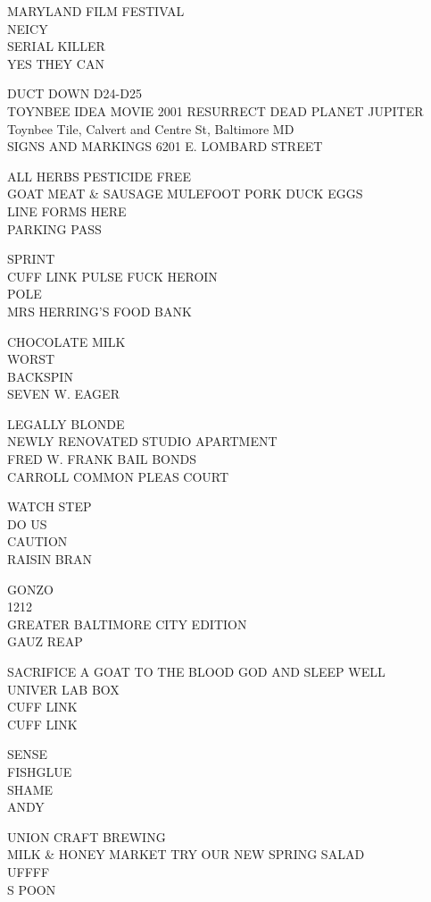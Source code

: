 \documentclass[10pt,letterpaper]{article}
\begin{document}
MARYLAND FILM FESTIVAL\\
NEICY\\
SERIAL KILLER\\
YES THEY CAN

DUCT DOWN D24{-}D25\\
TOYNBEE IDEA MOVIE 2001 RESURRECT DEAD PLANET JUPITER\\
Toynbee Tile, Calvert and Centre St, Baltimore MD\\
SIGNS AND MARKINGS 6201 E. LOMBARD STREET

ALL HERBS PESTICIDE FREE\\
GOAT MEAT \& SAUSAGE MULEFOOT PORK DUCK EGGS\\
LINE FORMS HERE\\
PARKING PASS

SPRINT\\
CUFF LINK PULSE FUCK HEROIN\\
POLE\\
MRS HERRING'S FOOD BANK

CHOCOLATE MILK\\
WORST\\
BACKSPIN\\
SEVEN W. EAGER

LEGALLY BLONDE\\
NEWLY RENOVATED STUDIO APARTMENT\\
FRED W. FRANK BAIL BONDS\\
CARROLL COMMON PLEAS COURT

WATCH STEP\\
DO US\\
CAUTION\\
RAISIN BRAN

GONZO\\
1212\\
GREATER BALTIMORE CITY EDITION\\
GAUZ REAP

SACRIFICE A GOAT TO THE BLOOD GOD AND SLEEP WELL\\
UNIVER LAB BOX\\
CUFF LINK\\
CUFF LINK

SENSE\\
FISHGLUE\\
SHAME\\
ANDY

UNION CRAFT BREWING\\
MILK \& HONEY MARKET TRY OUR NEW SPRING SALAD\\
UFFFF\\
S POON
\end{document}
